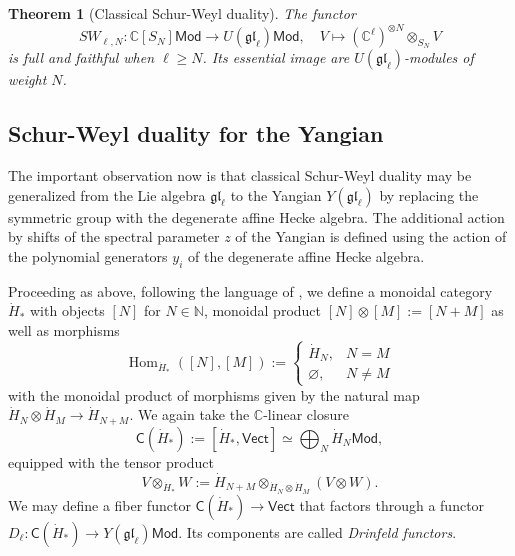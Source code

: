 \documentclass[11pt]{report}
\newtheorem{theorem}{Theorem}[section]
\theoremstyle{definition}
\theoremstyle{remark}
\theoremstyle{remark}
\newcommand{\Hom}{\operatorname{Hom}}
\newcommand{\N}{\mathbb{N}}
\newcommand{\C}{\mathbb{C}}
\begin{document}
\begin{theorem}[Classical Schur-Weyl duality]
The functor
\begin{equation*}
SW_{\ell,N}: \C[S_N]\mathsf{Mod} \to U(\mathfrak{gl}_\ell)\mathsf{Mod}, \quad V \mapsto (\C^\ell)^{\otimes N} \otimes_{S_N} V
\end{equation*}
is full and faithful when $\ell \geq N$. Its essential image are $U(\mathfrak{gl}_\ell)$-modules of weight $N$.
\end{theorem}

\subsection{Schur-Weyl duality for the Yangian}

The important observation now is that classical Schur-Weyl duality may be generalized from the Lie algebra $\mathfrak{gl}_\ell$ to the Yangian $Y(\mathfrak{gl}_\ell)$ by replacing the symmetric group with the degenerate affine Hecke algebra. The additional action by shifts of the spectral parameter $z$ of the Yangian is defined using the action of the polynomial generators $y_i$ of the degenerate affine Hecke algebra.

Proceeding as above, following the language of \cite{article:davydov:2010}, we define a monoidal category $\dot H_*$ with objects $[N]$ for $N \in \N$, monoidal product $[N] \otimes [M] := [N+M]$ as well as morphisms
\begin{equation*}
\Hom_{\dot H_*}([N],[M]) :=
\begin{cases}
\dot H_N, & N = M \\
\varnothing, & N \neq M
\end{cases}
\end{equation*}
with the monoidal product of morphisms given by the natural map $\dot H_N \otimes \dot H_M \to \dot H_{N+M}$. We again take the $\C$-linear closure
\begin{equation*}
\mathsf{C}(\dot H_*) := [\dot H_*,\mathsf{Vect}] \simeq \bigoplus_N \dot H_N\mathsf{Mod},
\end{equation*}
equipped with the tensor product
\begin{equation*}
V \otimes_{\dot H_*} W := \dot H_{N+M} \otimes_{\dot H_N \otimes \dot H_M} (V \otimes W).
\end{equation*}
We may define a fiber functor $\mathsf{C}(\dot H_*) \to \mathsf{Vect}$ that factors through a functor $D_\ell: \mathsf{C}(\dot H_*) \to Y(\mathfrak{gl}_\ell)\mathsf{Mod}$. Its components are called \emph{Drinfeld functors}.
\end{document}
